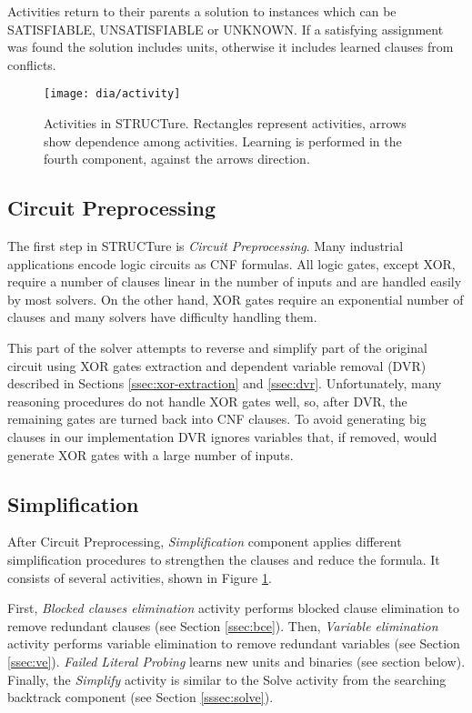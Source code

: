 Activities return to their parents a solution to instances which can be
\textsf{SATISFIABLE}, \textsf{UNSATISFIABLE} or \textsf{UNKNOWN}. If
a satisfying assignment was found the solution includes units,
otherwise it includes learned clauses from conflicts.

\begin{figure}
  \centering
  \texttt{[image: dia/activity]}
  \caption{Activities in STRUCTure. Rectangles represent activities,
  arrows show dependence among activities. Learning is
  performed in the fourth component, against the arrows direction.}
  \label{fig:activities}
\end{figure}


\subsection{Circuit Preprocessing}

The first step in STRUCTure is \emph{Circuit Preprocessing}. Many
industrial applications encode logic circuits as CNF formulas.
All logic gates, except XOR, require a number of clauses linear in the number
of inputs and are handled easily by most solvers. On the other hand,
XOR gates require an exponential number of clauses and many solvers
have difficulty handling them.

This part of the solver attempts to reverse and simplify part of the
original circuit using XOR gates extraction and dependent variable
removal (DVR) described in Sections \ref{ssec:xor-extraction}
and \ref{ssec:dvr}.  Unfortunately, many reasoning procedures do
not handle XOR gates well, so, after DVR, the remaining gates are
turned back into CNF clauses. To avoid generating big clauses in
our implementation DVR ignores variables that, if removed,
would generate XOR gates with a large number of inputs.


\subsection{Simplification}

After Circuit Preprocessing, \emph{Simplification} component applies
different simplification procedures to strengthen the clauses and
reduce the formula. It consists of several activities, shown in
Figure \ref{fig:activities}.

First, \emph{Blocked clauses elimination} activity performs
blocked clause elimination to remove redundant clauses (see Section
\ref{ssec:bce}). Then, \emph{Variable elimination} activity performs
variable elimination to remove redundant variables (see Section
\ref{ssec:ve}). \emph{Failed Literal Probing} learns new units
and binaries (see section below).  Finally, the \emph{Simplify}
activity is similar to the Solve activity from the searching
backtrack component (see Section \ref{sssec:solve}).

